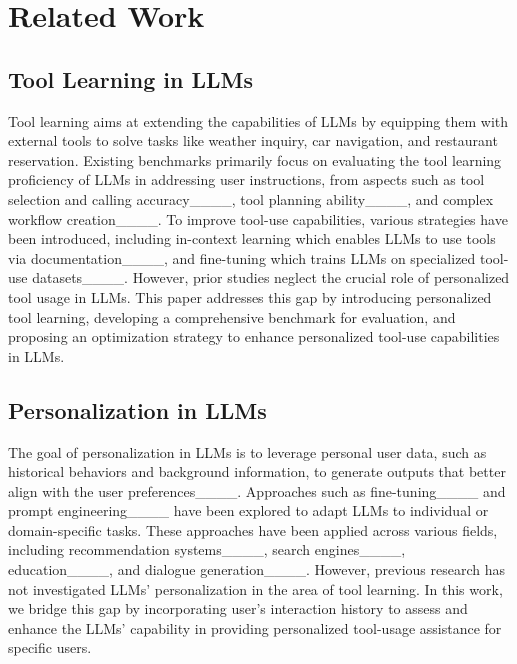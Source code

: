 \section{Related Work}
\subsection{Tool Learning in LLMs}
Tool learning aims at extending the capabilities of LLMs by equipping them with external tools to solve tasks like weather inquiry, car navigation, and restaurant reservation. Existing benchmarks primarily focus on evaluating the tool learning proficiency of LLMs in addressing user instructions, from aspects such as 
tool selection and calling accuracy____, tool planning ability____, and complex workflow creation____. To improve tool-use capabilities, various strategies have been introduced, including in-context learning which enables LLMs to use tools via documentation____,
and fine-tuning which trains LLMs on specialized tool-use datasets____. However, prior studies neglect the crucial role of personalized tool usage in LLMs. This paper addresses this gap by introducing personalized tool learning, developing a comprehensive benchmark for evaluation, and proposing an optimization strategy to enhance personalized tool-use capabilities in LLMs.

\subsection{Personalization in LLMs}
The goal of personalization in LLMs is to leverage personal user data, such as historical behaviors and background information, to generate outputs that better align with the user preferences____.
Approaches such as fine-tuning____ and prompt engineering____
have been explored to adapt LLMs to individual or domain-specific tasks. These approaches have been applied across various fields, including recommendation systems____, search engines____, education____, 
and dialogue generation____. However, previous research has not investigated LLMs' personalization in the area of tool learning. In this work, we bridge this gap by incorporating user's interaction history to assess and enhance the LLMs' capability in providing personalized tool-usage assistance for specific users.



